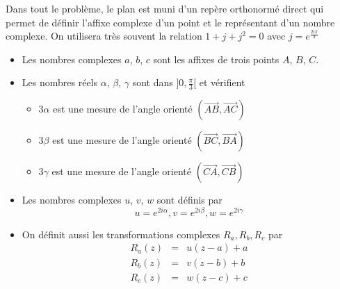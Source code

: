 Dans tout le probl{\`e}me, le plan est muni d'un rep{\`e}re orthonorm{\'e} direct qui permet de d{\'e}finir l'affixe complexe d'un point et le repr{\'e}sentant d'un nombre complexe.\newline
On utilisera tr{\`e}s souvent la relation $1+j+j^2=0$ avec $j=e^{\frac{2i\pi}{3}}$
\begin{itemize}
\item Les nombres complexes $a$, $b$, $c$ sont les affixes de trois
points $A$, $B$, $C$.

\item Les nombres r{\'e}els $\alpha$, $\beta$, $\gamma$ sont dans
$]0,\frac{\pi}{3}[$ et v{\'e}rifient
    \begin{itemize}
        \item $3\alpha$  est une mesure de l'angle orient{\'e} $(\overrightarrow{AB},\overrightarrow{AC})$
        \item $3\beta$  est une mesure de l'angle orient{\'e} $(\overrightarrow{BC},\overrightarrow{BA})$
        \item $3\gamma$  est une mesure de l'angle orient{\'e} $(\overrightarrow{CA},\overrightarrow{CB})$
    \end{itemize}

  \item Les nombres complexes $u$, $v$, $w$ sont d{\'e}finis par
  \[u=e^{2i\alpha},v=e^{2i\beta},w=e^{2i\gamma}\]
  \item On d{\'e}finit aussi les transformations complexes
  $R_a,R_b,R_c$ par
  \begin{eqnarray*}
  R_a(z)&=& u(z-a)+a\\
  R_b(z)&=& v(z-b)+b\\
  R_c(z)&=& w(z-c)+c\\
  \end{eqnarray*}

\end{itemize}

